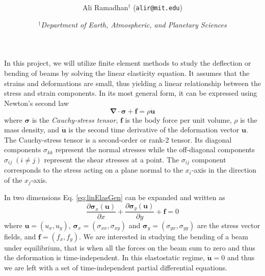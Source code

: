 \documentclass[11pt]{article}
\title{\spacedlowsmallcaps{6.339: Numerical Methods for Partial Differential Equations}\\ \spacedlowsmallcaps{Project three: Finite Element Methods}}
\author{Ali Ramadhan$^\text{†}$ (\texttt{alir@mit.edu})}
\date{\textit{$^\text{†}$Department of Earth, Atmospheric, and Planetary Sciences}}
\newcommand\p[2]{\frac{\partial #1}{\partial #2}}
\begin{document}
\maketitle

In this project, we will utilize finite element methods to study the deflection or bending of beams by solving the linear elasticity equation. It assumes that the strains and deformations are small, thus yielding a linear relationship between the stress and strain components. In its most general form, it can be expressed using Newton's second law
\begin{equation} \label{eq:linElasGen}
  \bm{\nabla\cdot\sigma + f} = \rho\ddot{\bm{u}}
\end{equation}
where $\bm{\sigma}$ is the \emph{Cauchy-stress tensor}, $\bm{f}$ is the body force per unit volume, $\rho$ is the mass density, and $\ddot{\bm{u}}$ is the second time derivative of the deformation vector $\bm{u}$. The Cauchy-stress tensor is a second-order or rank-2 tensor. Its diagonal components $\sigma_{kk}$ represent the normal stresses while the off-diagonal components $\sigma_{ij} \; (i \ne j)$  represent the shear stresses at a point. The $\sigma_{ij}$ component corresponds to the stress acting on a plane normal to the $x_i$-axis in the direction of the $x_j$-axis.

In two dimensions Eq. \eqref{eq:linElasGen} can be expanded and written as
\begin{equation} \label{eq:linElas}
  \p{\bm{\sigma}_x(\bm{u})}{x} + \p{\bm{\sigma}_y(\bm{u})}{y} + \bm{f} = 0
\end{equation}
where $\bm{u} = (u_x, u_y)$, $\bm{\sigma}_x = (\sigma_{xx}, \sigma_{xy})$ and $\bm{\sigma}_y = (\sigma_{yx}, \sigma_{yy})$ are the stress vector fields, and $\bm{f} = (f_x, f_y)$. We are interested in studying the bending of a beam under equilibrium, that is when all the forces on the beam sum to zero and thus the deformation is time-independent. In this elastostatic regime, $\ddot{\bm{u}} = 0$ and thus we are left with a set of time-independent partial differential equations.
\end{document}
